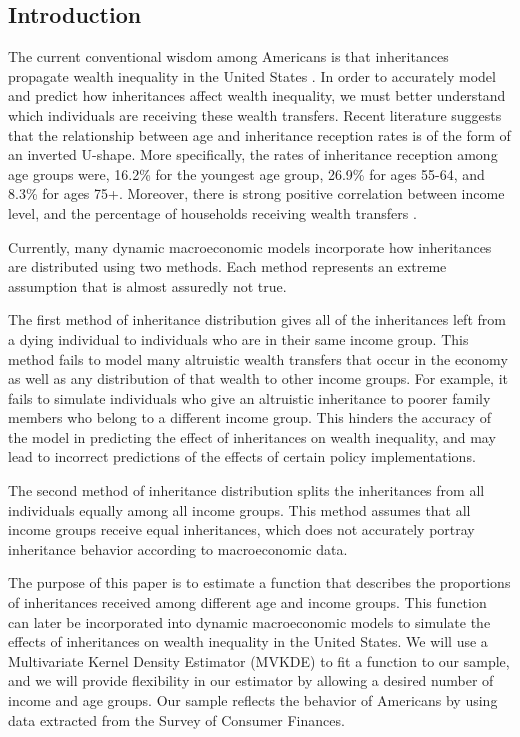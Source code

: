 \documentclass[letterpaper,12pt]{article}
\theoremstyle{definition}
\begin{document}
\begin{spacing}{1.5}

\section{Introduction}\label{SecIntro}

The current conventional wisdom among Americans is that inheritances propagate wealth inequality in the United States \citet{Wolff:2015}. In order to accurately model and predict how inheritances affect wealth inequality, we must better understand which individuals are receiving these wealth transfers. Recent literature suggests that the relationship between age and inheritance reception rates is of the form of an inverted U-shape. More specifically, the rates of inheritance reception among age groups were, 16.2\% for the youngest age group, 26.9\% for ages 55-64, and 8.3\% for ages 75+. Moreover, there is strong positive correlation between income level, and the percentage of households receiving wealth transfers \citet{Wolff:2015}.

Currently, many dynamic macroeconomic models incorporate how
inheritances are distributed using two methods. Each method represents an extreme assumption 
that is almost assuredly not true.

The first method of inheritance distribution gives all of the inheritances left from a dying 
individual to individuals who are in their same income group. This method fails to model many 
altruistic wealth transfers that occur in the economy as well as any distribution of that wealth to 
other income groups. For example, it fails to simulate individuals who give an altruistic inheritance 
to poorer family members who belong to a different income group. This hinders the accuracy of 
the model in predicting the effect of inheritances on wealth inequality, and may lead to incorrect 
predictions of the effects of certain policy implementations.

The second method of inheritance distribution splits the inheritances from all individuals 
equally among all income groups. This method assumes that all income groups receive equal 
inheritances, which does not accurately portray inheritance behavior according to macroeconomic data.

  The purpose of this paper is to estimate a function that describes the proportions of inheritances received among different age and income groups. This function can later be incorporated into dynamic macroeconomic models to simulate the effects of inheritances on wealth inequality in the United States. We will use a Multivariate Kernel Density Estimator (MVKDE) to fit a function to our sample, and we will provide flexibility in our estimator by allowing a desired number of income and age groups. Our sample reflects the behavior of Americans by using data extracted from the Survey of Consumer Finances.




\end{spacing}
\end{document}
